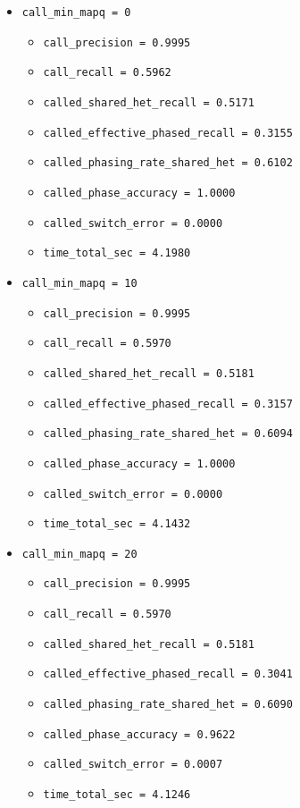 \documentclass[
]{article}
\providecommand{\tightlist}{%
  \setlength{\itemsep}{0pt}\setlength{\parskip}{0pt}}
\begin{document}
\begin{itemize}
\tightlist
\item
  \texttt{call\_min\_mapq\ =\ 0}

  \begin{itemize}
  \tightlist
  \item
    \texttt{call\_precision\ =\ 0.9995}
  \item
    \texttt{call\_recall\ =\ 0.5962}
  \item
    \texttt{called\_shared\_het\_recall\ =\ 0.5171}
  \item
    \texttt{called\_effective\_phased\_recall\ =\ 0.3155}
  \item
    \texttt{called\_phasing\_rate\_shared\_het\ =\ 0.6102}
  \item
    \texttt{called\_phase\_accuracy\ =\ 1.0000}
  \item
    \texttt{called\_switch\_error\ =\ 0.0000}
  \item
    \texttt{time\_total\_sec\ =\ 4.1980}
  \end{itemize}
\item
  \texttt{call\_min\_mapq\ =\ 10}

  \begin{itemize}
  \tightlist
  \item
    \texttt{call\_precision\ =\ 0.9995}
  \item
    \texttt{call\_recall\ =\ 0.5970}
  \item
    \texttt{called\_shared\_het\_recall\ =\ 0.5181}
  \item
    \texttt{called\_effective\_phased\_recall\ =\ 0.3157}
  \item
    \texttt{called\_phasing\_rate\_shared\_het\ =\ 0.6094}
  \item
    \texttt{called\_phase\_accuracy\ =\ 1.0000}
  \item
    \texttt{called\_switch\_error\ =\ 0.0000}
  \item
    \texttt{time\_total\_sec\ =\ 4.1432}
  \end{itemize}
\item
  \texttt{call\_min\_mapq\ =\ 20}

  \begin{itemize}
  \tightlist
  \item
    \texttt{call\_precision\ =\ 0.9995}
  \item
    \texttt{call\_recall\ =\ 0.5970}
  \item
    \texttt{called\_shared\_het\_recall\ =\ 0.5181}
  \item
    \texttt{called\_effective\_phased\_recall\ =\ 0.3041}
  \item
    \texttt{called\_phasing\_rate\_shared\_het\ =\ 0.6090}
  \item
    \texttt{called\_phase\_accuracy\ =\ 0.9622}
  \item
    \texttt{called\_switch\_error\ =\ 0.0007}
  \item
    \texttt{time\_total\_sec\ =\ 4.1246}
  \end{itemize}
\end{itemize}
\end{document}
